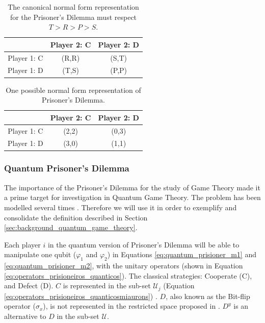 \begin{center}
\begin{table}
\begin{centering}
\begin{tabular}{ccc}
\hline 
 & Player 2: C & Player 2: D\tabularnewline
\hline 
Player 1: C & (R,R) & (S,T)\tabularnewline
Player 1: D & (T,S) & (P,P)\tabularnewline
\hline 
\end{tabular}
\par\end{centering}

\caption{The canonical normal form representation for the Prisoner's Dilemma must respect $T>R>P>S$.}
\label{tab:prisionersdillema_tab1}
\end{table}
\par\end{center}

\begin{center}
\begin{table}
\begin{centering}
\begin{tabular}{ccc}
\hline 
 & Player 2: C & Player 2: D\tabularnewline
\hline 
Player 1: C & (2,2) & (0,3)\tabularnewline
Player 1: D & (3,0) & (1,1)\tabularnewline
\hline 
\end{tabular}
\par\end{centering}

\caption{One possible normal form representation of Prisoner's Dilemma.}
\label{tab:prisionersdillema_tab2}
\end{table}
\par\end{center}


\subsubsection{Quantum Prisoner's Dilemma}
\label{subsubsec:quantum_prisioners_dillema}

The importance of the Prisoner's Dilemma for the study of Game Theory made it a prime target for investigation in Quantum Game Theory. The problem has been modelled several times \cite{Eisert2008}\cite{Letters2002}. Therefore we will use it in order to exemplify and consolidate the definition described in Section \ref{sec:background_quantum_game_theory}\cite{Fra2011a}. 

Each player $i$ in the quantum version of Prisoner's Dilemma will be able to manipulate one qubit ($\varphi_{1}$ and $\varphi_{2}$) in Equations \ref{eq:quantum_prisioner_m1} and \ref{eq:quantum_prisioner_m2}, with the unitary operators (shown in Equation \ref{eq:operators_prisioneiros_quanticos}). The  classical strategies: Cooperate (C), and Defect (D). $C$ is represented in the sub-set $\mathcal{U}_{j}$ (Equation \ref{eq:operators_prisioneiros_quanticosmiaurons}) . $D$, also known as the Bit-flip operator ($\sigma_{x}$), is not represented in the restricted space proposed in \cite{Eisert2008}\cite{Fra2011a}. $D^{y}$ is an alternative to $D$ in the sub-set $\mathcal{U}$.

